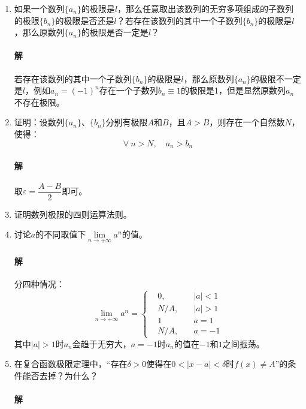 \documentclass[fontset=none,openany,a4paper]{ctexbook}
\begin{document}
\begin{enumerate}

    \item 如果一个数列$\{a_n\}$的极限是$l$，那么任意取出该数列的无穷多项组成的子数列的极限$\{b_n\}$的极限是否还是$l$？若存在该数列的其中一个子数列$\{b_n\}$的极限是$l$，那么原数列$\{a_n\}$的极限是否一定是$l$？

    \paragraph{解}
    若存在该数列的其中一个子数列$\{b_n\}$的极限是$l$，那么原数列$\{a_n\}$的极限不一定是$l$，例如${a_n}=(-1)^n$存在一个子数列${b_n}\equiv1$的极限是1，但是显然原数列${a_n}$不存在极限。

    \item 证明：设数列$\{a_n\}$、$\{b_n\}$分别有极限$A$和$B$，且$A>B$，则存在一个自然数$N$，使得：
    \[
    \forall\ n>N,\quad a_n > b_n
    \]

    \paragraph{解}

    取$\varepsilon=\dfrac{A-B}{2}$即可。

    \item 证明数列极限的四则运算法则。

    \item 讨论$a$的不同取值下$\lim\limits_{n\to+\infty}a^n$的值。

    \paragraph{解}

    分四种情况：
    \[
    \lim_{n\to+\infty}a^n = \left\{
        \begin{aligned}
            &0,\quad &|a|<1 \\
            &N/A,\quad &|a|>1 \\
            &1\quad &a=1 \\
            &N/A,\quad &a=-1
        \end{aligned}
    \right.
    \]
    其中$|a|>1$时${a_n}$会趋于无穷大，$a=-1$时$a_n$的值在$-1$和$1$之间振荡。

    \item 在复合函数极限定理中，“存在$\delta>0$使得在$0<|x-a|<\delta$时$f(x)\neq A$”的条件能否去掉？为什么？

    \paragraph{解}


\end{enumerate}
\end{document}
